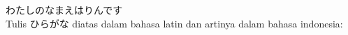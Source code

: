 {\japantwo わたしのなまえはりんです} \\
Tulis {\japan ひらがな} diatas dalam bahasa latin dan artinya dalam bahasa indonesia:
\\
